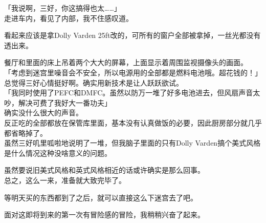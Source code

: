「我说啊，三好，你这搞得也太……」\\

走进车内，看见了内部，我不住感叹道。

看起来应该是拿Dolly Varden 25ft改的，可所有的窗户全部被拿掉，一丝光都没有透出来。

餐厅和里面的床上吊着两个大大的屏幕，上面显示着周围监视摄像头的画面。\\

「考虑到迷宫里噪音会不安全，所以电源用的全部都是燃料电池哦。超花钱的！」\\

总觉得三好心情挺好啊。确实用新技术是让人跃跃欲试。\\

「我同时使用了PEFC和DMFC。虽然以防万一堆了好多电池进去，但风扇声音太吵，解决可费了我好大一番功夫」\\

确实没什么很大的声音。\\

反正吃的全部都放在保管库里面，基本没有认真做饭的必要，因此厨房部分就几乎都省略掉了。\\

虽然三好叽里呱啦地说明了一堆，但我脑子里面的只有Dolly Varden搞个美式风格是什么情况这种没啥意义的问题。

虽然要说旧美式风格和英式风格相近的话或许确实是那么回事。\\

总之，这么一来，准备就大致完毕了。

等明天买的东西都到了之后，就可以直接这么下迷宫去了吧。

面对这即将到来的第一次有冒险感的冒险，我稍稍兴奋了起来。\\
